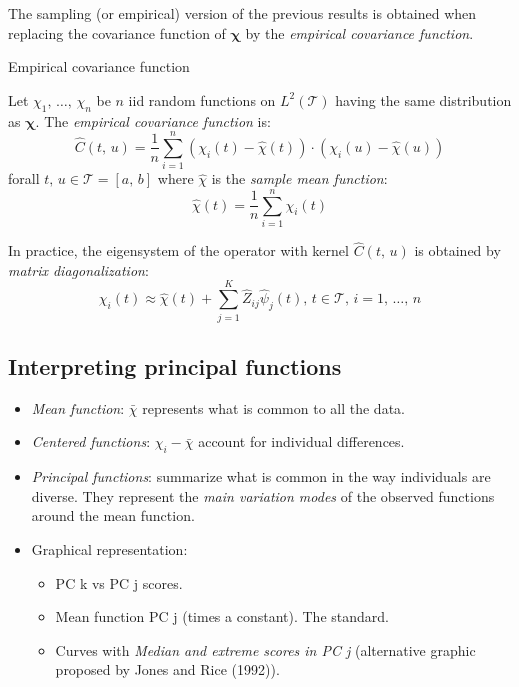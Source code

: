 The sampling (or empirical) version of the previous
results is obtained when replacing the covariance function of $\boldsymbol \chi$
by the \emph{empirical covariance function}.

\begin{definition}{Empirical covariance function}{}

    Let $\chi_1,\, \dots,\, \chi_n$ be $n$ iid random functions on $L^2(\mathcal T)$
    having the same distribution as $\boldsymbol \chi$. The \emph{empirical covariance function}
    is:
    \begin{equation*}
        \hat C(t,\,u) = \frac{1}{n} \sum_{i=1}^n \left(
            \chi_i(t) - \hat \chi(t)
        \right)\cdot \left(
            \chi_i(u) - \hat \chi(u)
        \right)
    \end{equation*}
    forall $t,\,u \in \mathcal T = [a,\,b]$ where $\hat \chi$ is the \emph{sample mean function}:
    \begin{equation*}
        \hat \chi(t) = \frac{1}{n} \sum_{i=1}^n \chi_i(t)
    \end{equation*}

    \tcblower

    In practice, the eigensystem of the operator with kernel $\hat C(t,\,u)$ is
    obtained by \emph{matrix diagonalization}:
    \begin{equation*}
        \chi_i(t) \approx \hat \chi(t) + \sum_{j=1}^K \hat Z_{ij} \hat \psi_j(t),\,t \in \mathcal T,\,i=1,\, \dots,\, n
    \end{equation*}

\end{definition}

\subsection{Interpreting principal functions}
\begin{itemize}
    \item \emph{Mean function}: $\bar \chi$ represents what is common to all the data.
    \item \emph{Centered functions}: $\chi_i - \bar \chi$ account for individual differences.
    \item \emph{Principal functions}: summarize what is common in the way individuals are
        diverse. They represent the \emph{main variation modes} of the observed functions
        around the mean function.
    \item Graphical representation:
        \begin{itemize}
            \item PC k vs PC j scores.
            \item Mean function \textpm PC j (times a constant). The standard.
            \item Curves with \emph{Median and extreme scores in PC j}
                (alternative graphic proposed by Jones and Rice (1992)).
        \end{itemize}
\end{itemize}

